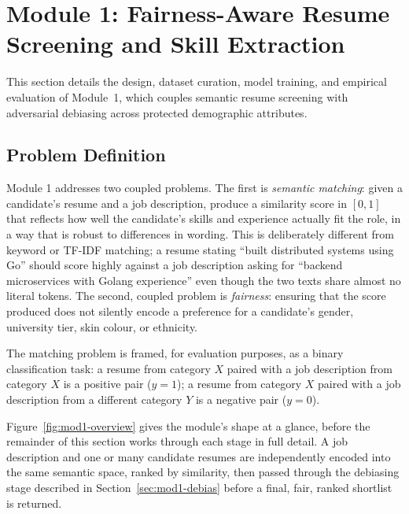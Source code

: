 \documentclass[11pt,a4paper]{article}
\begin{document}
\clearpage
\section[Module 1: Fair Resume Screening]{Module 1: Fairness-Aware Resume Screening and Skill Extraction}
\label{sec:mod1}

This section details the design, dataset curation, model training, and empirical evaluation of Module~1, which couples semantic resume screening with adversarial debiasing across protected demographic attributes.

\subsection{Problem Definition}

Module 1 addresses two coupled problems. The first is \emph{semantic matching}: given a candidate's resume and a job description, produce a similarity score in $[0,1]$ that reflects how well the candidate's skills and experience actually fit the role, in a way that is robust to differences in wording. This is deliberately different from keyword or TF-IDF matching; a resume stating ``built distributed systems using Go'' should score highly against a job description asking for ``backend microservices with Golang experience'' even though the two texts share almost no literal tokens. The second, coupled problem is \emph{fairness}: ensuring that the score produced does not silently encode a preference for a candidate's gender, university tier, skin colour, or ethnicity.

The matching problem is framed, for evaluation purposes, as a binary classification task: a resume from category $X$ paired with a job description from category $X$ is a positive pair ($y=1$); a resume from category $X$ paired with a job description from a different category $Y$ is a negative pair ($y=0$).

Figure~\ref{fig:mod1-overview} gives the module's shape at a glance, before the remainder of this section works through each stage in full detail. A job description and one or many candidate resumes are independently encoded into the same semantic space, ranked by similarity, then passed through the debiasing stage described in Section~\ref{sec:mod1-debias} before a final, fair, ranked shortlist is returned.
\end{document}
